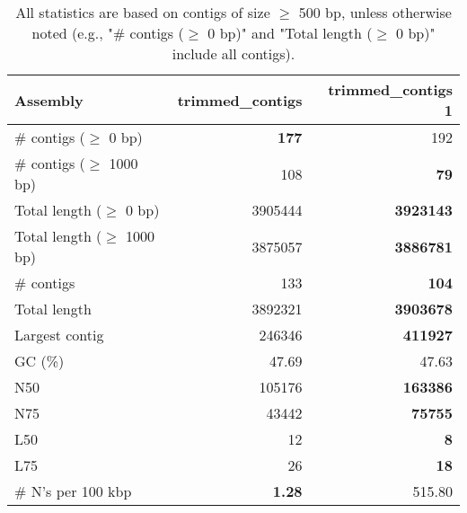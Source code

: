 \documentclass[12pt,a4paper]{article}
\begin{document}
\begin{table}[ht]
\begin{center}
\caption{All statistics are based on contigs of size $\geq$ 500 bp, unless otherwise noted (e.g., "\# contigs ($\geq$ 0 bp)" and "Total length ($\geq$ 0 bp)" include all contigs).}
\begin{tabular}{|l*{2}{|r}|}
\hline
Assembly & trimmed\_contigs & trimmed\_contigs 1 \\ \hline
\# contigs ($\geq$ 0 bp) & {\bf 177} & 192 \\ \hline
\# contigs ($\geq$ 1000 bp) & 108 & {\bf 79} \\ \hline
Total length ($\geq$ 0 bp) & 3905444 & {\bf 3923143} \\ \hline
Total length ($\geq$ 1000 bp) & 3875057 & {\bf 3886781} \\ \hline
\# contigs & 133 & {\bf 104} \\ \hline
Total length & 3892321 & {\bf 3903678} \\ \hline
Largest contig & 246346 & {\bf 411927} \\ \hline
GC (\%) & 47.69 & 47.63 \\ \hline
N50 & 105176 & {\bf 163386} \\ \hline
N75 & 43442 & {\bf 75755} \\ \hline
L50 & 12 & {\bf 8} \\ \hline
L75 & 26 & {\bf 18} \\ \hline
\# N's per 100 kbp & {\bf 1.28} & 515.80 \\ \hline
\end{tabular}
\end{center}
\end{table}
\end{document}
